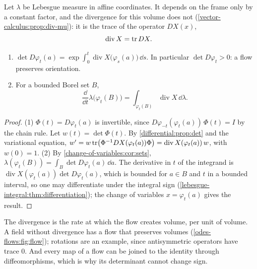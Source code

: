 \begin{notechapter}
Let $\lambda$ be Lebesgue measure in affine coordinates. It depends on
the frame only by a constant factor, and the divergence for this
volume does not (\cref{vector-calculus:prop:div-mu}): it is the trace
of the operator $DX(x)$,
\[
  \operatorname{div}X = \operatorname{tr} DX .
\]

\begin{theorem}[Liouville]\label{odes-flows:thm:liouville}
\begin{enumerate}[nosep]
  \item $\det D\varphi_t(a)
        = \exp\int_0^t\operatorname{div}X\bigl(\varphi_s(a)\bigr)\,
        \dd s$. In particular $\det D\varphi_t > 0$: a flow preserves
        orientation.
  \item For a bounded Borel set $B$,
        \[
          \frac{\dd}{\dd t}\lambda\bigl(\varphi_t(B)\bigr)
          = \int_{\varphi_t(B)}\operatorname{div}X\,\dd\lambda .
        \]
\end{enumerate}
\end{theorem}

\begin{proof}
(1) $\Phi(t) = D\varphi_t(a)$ is invertible, since
$D\varphi_{-t}(\varphi_t(a))\,\Phi(t) = I$ by the chain rule. Let
$w(t) = \det\Phi(t)$. By \cref{differential:prop:det} and the
variational equation,
$w' = w\operatorname{tr}\bigl(\Phi^{-1}DX(\varphi_t(a))\Phi\bigr)
= \operatorname{div}X(\varphi_t(a))\,w$, with $w(0) = 1$. (2) By
\cref{change-of-variables:cor:sets},
$\lambda(\varphi_t(B)) = \int_B\det D\varphi_t(a)\,\dd a$. The
derivative in $t$ of the integrand is
$\operatorname{div}X(\varphi_t(a))\det D\varphi_t(a)$, which is
bounded for $a\in B$ and $t$ in a bounded interval, so one may
differentiate under the integral sign
(\cref{lebesgue-integral:thm:differentiation}); the change of
variables $x = \varphi_t(a)$ gives the result.
\end{proof}

\begin{keyidea}
The divergence is the rate at which the flow creates volume, per unit
of volume. A field without divergence has a flow that preserves
volumes (\cref{odes-flows:fig:flow}); rotations are an example, since
antisymmetric operators have
trace $0$. And every map of a flow can be joined to the identity
through diffeomorphisms, which is why its determinant cannot change
sign.
\end{keyidea}


\end{notechapter}
